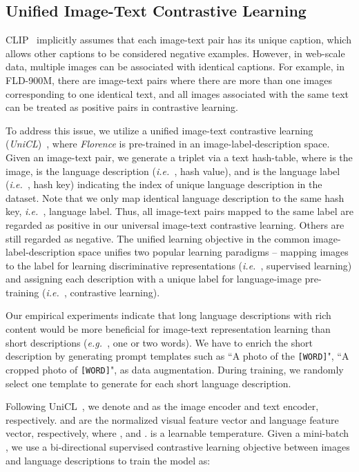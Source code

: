 \documentclass{article}
\newcommand{\eg}{{\it{e.g.}~}}
\newcommand{\ie}{{\it{i.e.}~}}
\begin{document}
\subsection{Unified Image-Text Contrastive Learning}
\label{sect:UniC}

CLIP~\cite{radford2021learning} implicitly assumes that each image-text pair has its unique caption, which allows other captions to be considered negative examples. However, in web-scale data, multiple images can be associated with identical captions. For example, in FLD-900M, there are  image-text pairs where there are more than one images corresponding to one identical text, and all images associated with the same text can be treated as positive pairs in contrastive learning.

To address this issue, we utilize a unified image-text contrastive learning
(\emph{UniCL})~\cite{Jianwei_UNICL2022}, where \emph{Florence} is pre-trained in an
image-label-description space. Given an image-text pair, we generate a triplet
 via a text hash-table, where  is
the image,  is the language description (\ie, hash value), and  is
the language label (\ie, hash key) indicating the index of unique language description in the
dataset. Note that we only map identical language description to the same hash key, \ie, language
label. Thus, all image-text pairs mapped to the same label  are regarded as positive
in our universal image-text contrastive learning. Others are still regarded as negative. The unified
learning objective in the common image-label-description space unifies two popular learning
paradigms -- mapping images to the label for learning discriminative representations (\ie,
supervised learning) and assigning each description with a unique label for language-image
pre-training (\ie, contrastive learning).

Our empirical experiments indicate that long language descriptions with rich content would be more
beneficial for image-text representation learning than short descriptions (\eg, one or two words).
We have to enrich the short description by generating prompt templates such as ``A photo of the
\texttt{[WORD]}", ``A cropped photo of \texttt{[WORD]}", as data augmentation. During
training, we randomly select one template to generate  for each short language
description.

Following UniCL~\cite{Jianwei_UNICL2022}, we denote  and  as the image encoder and text encoder, respectively.
 and  are the normalized visual feature vector and language feature
vector, respectively, where , and .  is a learnable temperature.
Given a mini-batch , we use a bi-directional supervised contrastive learning objective
between images and language descriptions to train the model as:
\end{document}
